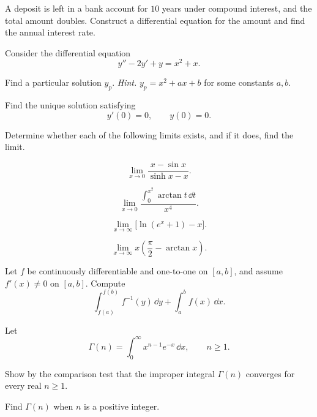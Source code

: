\begin{problem}
A deposit is left in a bank account for $10$ years under compound interest, and the total amount doubles. Construct a differential equation for the amount and find the annual interest rate.
\end{problem}

\begin{problem}
Consider the differential equation
\[
y''-2y'+y=x^2+x.
\]
\begin{problemsubparts}
\item Find a particular solution $y_p$. \textit{Hint.} $y_p=x^2+ax+b$ for some constants $a,b$.
\item Find the unique solution satisfying
\[
y'(0)=0,
\qquad
y(0)=0.
\]
\end{problemsubparts}
\end{problem}


\begin{problem}
Determine whether each of the following limits exists, and if it does, find the limit.
\begin{problemsubparts}
\item
\[
\lim_{x\to0}\frac{x-\sin x}{\sinh x-x}.
\]
\item
\[
\lim_{x\to0}
\frac{\displaystyle\int_0^{x^2}\arctan t\,\dd t}{x^4}.
\]
\item
\[
\lim_{x\to\infty}\bigl[\ln(e^x+1)-x\bigr].
\]
\item
\[
\lim_{x\to\infty}x\left(\frac\pi2-\arctan x\right).
\]
\end{problemsubparts}
\end{problem}

\begin{problem}
Let $f$ be continuously differentiable and one-to-one on $[a,b]$, and assume $f'(x)\ne0$ on $[a,b]$. Compute
\[
\int_{f(a)}^{f(b)}f^{-1}(y)\,\dd y
+
\int_a^b f(x)\,\dd x.
\]
\end{problem}

\begin{problem}
Let
\[
\Gamma(n)=\int_0^\infty x^{n-1}e^{-x}\,\dd x,
\qquad n\ge1.
\]
\begin{problemsubparts}
\item Show by the comparison test that the improper integral $\Gamma(n)$ converges for every real $n\ge1$.
\item Find $\Gamma(n)$ when $n$ is a positive integer.
\end{problemsubparts}
\end{problem}


